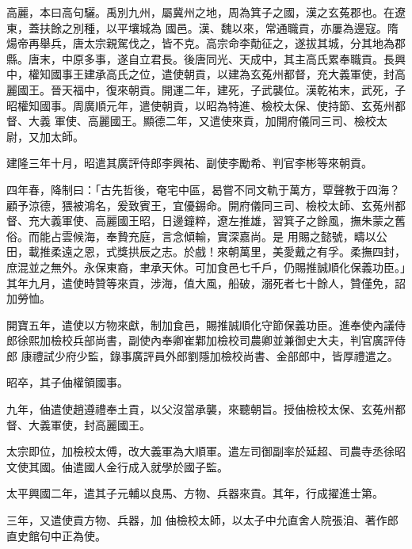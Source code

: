 
\begin{pinyinscope}

 高麗，本曰高句驪。禹別九州，屬冀州之地，周為箕子之國，漢之玄菟郡也。在遼東，蓋扶餘之別種，以平壤城為
 國邑。漢、魏以來，常通職貢，亦屢為邊寇。隋煬帝再舉兵，唐太宗親駕伐之，皆不克。高宗命李勣征之，遂拔其城，分其地為郡縣。唐末，中原多事，遂自立君長。後唐同光、天成中，其主高氏累奉職貢。長興中，權知國事王建承高氏之位，遣使朝貢，以建為玄菟州都督，充大義軍使，封高麗國王。晉天福中，復來朝貢。開運二年，建死，子武襲位。漢乾祐末，武死，子昭權知國事。周廣順元年，遣使朝貢，以昭為特進、檢校太保、使持節、玄菟州都督、大義
 軍使、高麗國王。顯德二年，又遣使來貢，加開府儀同三司、檢校太尉，又加太師。



 建隆三年十月，昭遣其廣評侍郎李興祐、副使李勵希、判官李彬等來朝貢。



 四年春，降制曰：「古先哲後，奄宅中區，曷嘗不同文軌于萬方，覃聲教于四海？顧予涼德，猥被鴻名，爰致賓王，宜優錫命。開府儀同三司、檢校太師、玄菟州都督、充大義軍使、高麗國王昭，日邊鐘粹，遼左推雄，習箕子之餘風，撫朱蒙之舊俗。而能占雲候海，奉贄充庭，言念傾輸，實深嘉尚。是
 用賜之懿號，疇以公田，載推柔遠之恩，式獎拱辰之志。於戲！來朝萬里，美愛戴之有孚。柔撫四封，庶混並之無外。永保東裔，聿承天休。可加食邑七千戶，仍賜推誠順化保義功臣。」其年九月，遣使時贊等來貢，涉海，值大風，船破，溺死者七十餘人，贊僅免，詔加勞恤。



 開寶五年，遣使以方物來獻，制加食邑，賜推誠順化守節保義功臣。進奉使內議侍郎徐熙加檢校兵部尚書，副使內奉卿崔鄴加檢校司農卿並兼御史大夫，判官廣評侍郎
 康禮試少府少監，錄事廣評員外郎劉隱加檢校尚書、金部郎中，皆厚禮遣之。



 昭卒，其子伷權領國事。



 九年，伷遣使趙遵禮奉土貢，以父沒當承襲，來聽朝旨。授伷檢校太保、玄菟州都督、大義軍使，封高麗國王。



 太宗即位，加檢校太傅，改大義軍為大順軍。遣左司御副率於延超、司農寺丞徐昭文使其國。伷遣國人金行成入就學於國子監。



 太平興國二年，遣其子元輔以良馬、方物、兵器來貢。其年，行成擢進士第。



 三年，又遣使貢方物、兵器，加
 伷檢校太師，以太子中允直舍人院張洎、著作郎直史館句中正為使。




\end{pinyinscope}
